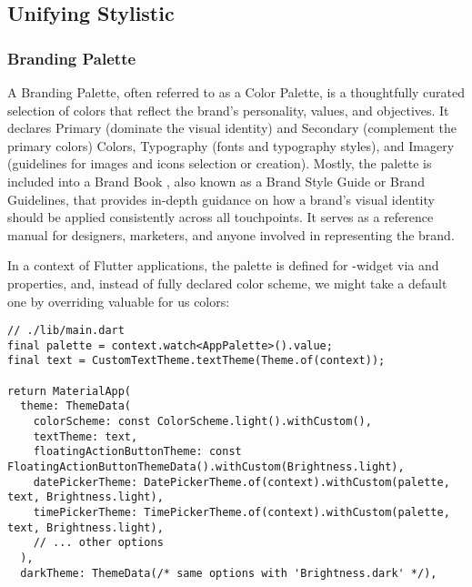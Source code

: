 
\subsection{Unifying Stylistic}


\subsubsection{Branding Palette}

A Branding Palette, often referred to as a Color Palette, is a thoughtfully curated selection of colors that reflect the 
brand's personality, values, and objectives. It declares Primary (dominate the visual identity) and Secondary 
(complement the primary colors) Colors, Typography (fonts and typography styles), and Imagery (guidelines for images 
and icons selection or creation). Mostly, the palette is included into a Brand Book \cite{Geyr16}, also known as a 
Brand Style Guide or Brand Guidelines, that provides in-depth guidance on how a brand's visual identity should be 
applied consistently across all touchpoints. It serves as a reference manual for designers, marketers, and anyone 
involved in representing the brand.

In a context of Flutter applications, the palette is defined for -widget via  and 
 properties, and, instead of fully declared color scheme, we might take a default one
by overriding valuable for us colors: 

\begin{lstlisting}
// ./lib/main.dart
final palette = context.watch<AppPalette>().value;
final text = CustomTextTheme.textTheme(Theme.of(context));

return MaterialApp(
  theme: ThemeData(
    colorScheme: const ColorScheme.light().withCustom(),
    textTheme: text,
    floatingActionButtonTheme: const FloatingActionButtonThemeData().withCustom(Brightness.light),
    datePickerTheme: DatePickerTheme.of(context).withCustom(palette, text, Brightness.light),
    timePickerTheme: TimePickerTheme.of(context).withCustom(palette, text, Brightness.light),
    // ... other options
  ),
  darkTheme: ThemeData(/* same options with 'Brightness.dark' */),
\end{lstlisting}

